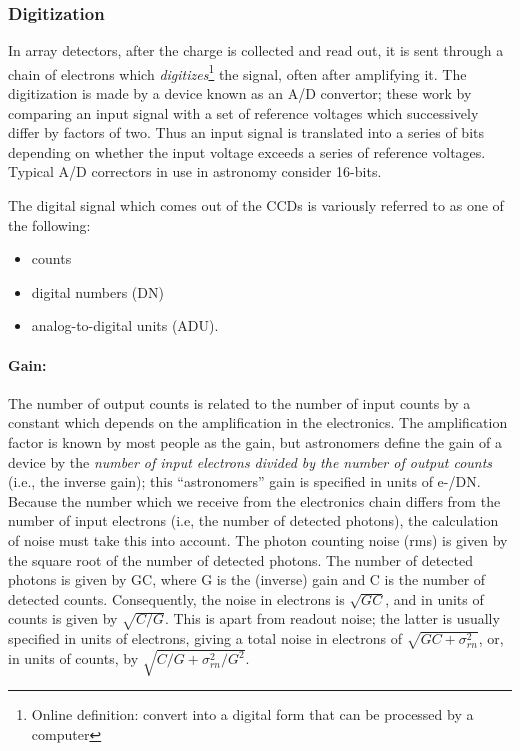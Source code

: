 \documentclass[12pt]{article}
\begin{document}
\subsubsection{Digitization}
In array detectors, after the charge is collected and read out, it is
sent through a chain of electrons which
\textit{digitizes}\footnote{Online definition: convert into a digital
form that can be processed by a computer}
the signal, often
after amplifying it. The digitization is made by a device known as an
A/D convertor; these work by comparing an input signal with a set of
reference voltages which successively differ by factors of two. Thus
an input signal is translated into a series of bits depending on
whether the input voltage exceeds a series of reference voltages.
Typical A/D correctors in use in astronomy consider 16-bits.

The digital signal which comes out of the CCDs is variously referred to as
one of the following:
\begin{itemize}
    \item counts
    \item digital numbers (DN)
    \item analog-to-digital units (ADU).
\end{itemize}
\paragraph{Gain:}
The number of output counts is related to the number of input counts by a
constant which depends on the amplification in the electronics. The
amplification factor is known by most people as the gain, but
astronomers define the gain of a device by the \textit{number of input
electrons divided by the number of output counts} (i.e., the inverse
gain); this ``astronomers'' gain is specified in units of e-/DN.
Because the number which we receive from the electronics chain differs
from the number of input electrons (i.e, the number of detected
photons), the calculation of noise must take this into account. The
photon counting noise (rms) is given by the square root of the number
of detected photons. The number of detected photons is given by GC,
where G is the (inverse) gain and C is the number of detected counts.
Consequently, the noise in electrons is $ \sqrt{{GC}}$, and in units
of counts is given by  $ \sqrt{{C/G}}$. This is apart from readout
noise; the latter is usually specified in units of electrons, giving a
total noise in electrons of  $ \sqrt{{GC+\sigma_{rn}^2}}$, or, in
units of counts, by  $ \sqrt{{C/G+\sigma_{rn}^2/G^2}}$.
\end{document}
